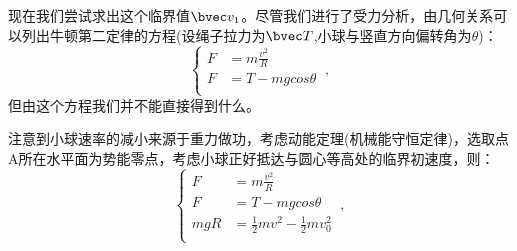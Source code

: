 现在我们尝试求出这个临界值$\bvec v_1$。尽管我们进行了受力分析，由几何关系可以列出牛顿第二定律的方程(设绳子拉力为$\bvec T$,小球与竖直方向偏转角为$\theta$)：
$$
\left \{
\begin{aligned}
F&=m\frac{v^2}{R}\\
F&=T-mg cos \theta \\
\end{aligned}
\right.
~,
$$
但由这个方程我们并不能直接得到什么。

注意到小球速率的减小来源于重力做功，考虑动能定理(机械能守恒定律)，选取点A所在水平面为势能零点，考虑小球正好抵达与圆心等高处的临界初速度，则：
$$
\left \{
\begin{aligned}
F&=m\frac{v^2}{R}\\
F&=T-mg cos \theta \\
mgR&=\frac12 mv^2-\frac12 mv_0^2\\
\end{aligned}
\right.
~,
$$
